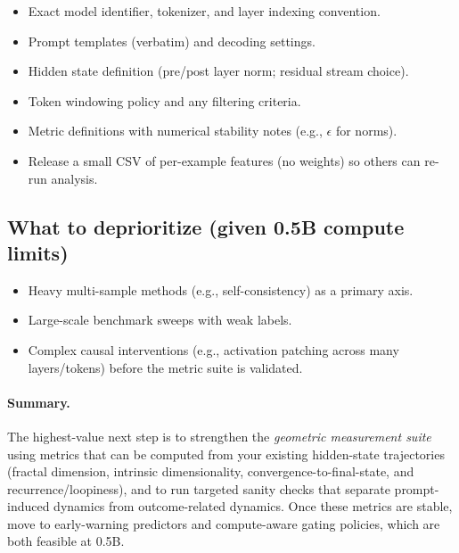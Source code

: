 \begin{itemize}[leftmargin=*]
\item Exact model identifier, tokenizer, and layer indexing convention.
\item Prompt templates (verbatim) and decoding settings.
\item Hidden state definition (pre/post layer norm; residual stream choice).
\item Token windowing policy and any filtering criteria.
\item Metric definitions with numerical stability notes (e.g., $\epsilon$ for norms).
\item Release a small CSV of per-example features (no weights) so others can re-run analysis.
\end{itemize}

\subsection{What to deprioritize (given 0.5B compute limits)}

\begin{itemize}[leftmargin=*]
\item Heavy multi-sample methods (e.g., self-consistency) as a primary axis.
\item Large-scale benchmark sweeps with weak labels.
\item Complex causal interventions (e.g., activation patching across many layers/tokens) before the metric suite is validated.
\end{itemize}

\paragraph{Summary.} The highest-value next step is to strengthen the \emph{geometric measurement suite} using metrics that can be computed from your existing hidden-state trajectories (fractal dimension, intrinsic dimensionality, convergence-to-final-state, and recurrence/loopiness), and to run targeted sanity checks that separate prompt-induced dynamics from outcome-related dynamics. Once these metrics are stable, move to early-warning predictors and compute-aware gating policies, which are both feasible at 0.5B.